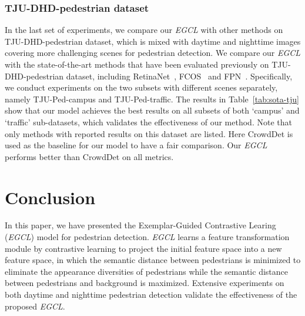 \documentclass[journal]{IEEEtran}
\newcommand{\MR}[1]{\textcolor[rgb]{0,0,0} {#1}}
\begin{document}
\subsubsection{TJU-DHD-pedestrian dataset}
In the last set of experiments, we compare our \emph{EGCL} with other methods on TJU-DHD-pedestrian dataset, which is mixed with daytime and nighttime images covering more challenging scenes for pedestrian detection. We compare our \emph{EGCL} with the state-of-the-art methods that have been evaluated previously on TJU-DHD-pedestrian dataset, including RetinaNet~\cite{lin2017focal}, FCOS~\cite{tian2019fcos} and FPN~\cite{lin2017feature}.  Specifically, we conduct experiments on the two subsets with different scenes separately, namely TJU-Ped-campus and TJU-Ped-traffic.
The results in Table~\ref{tab:sota-tju} show that our model achieves the best results on all subsets of both `campus' and `traffic' sub-datasets, which validates the effectiveness of our method. Note that only methods with reported results on this dataset are listed. Here CrowdDet is used as the baseline for our model to have a fair comparison. Our \emph{EGCL} \MR{performs better than CrowdDet on all metrics}.
\vspace{-5pt}


\section{Conclusion}
In this paper, we have presented the Exemplar-Guided Contrastive Learing (\emph{EGCL}) model for pedestrian detection. \emph{EGCL} learns a feature transformation module by contrastive learning to project the initial feature space into a new feature space, in which the semantic distance between pedestrians is minimized to eliminate the appearance diversities of pedestrians while the semantic distance between pedestrians and background is maximized. Extensive experiments on both daytime and nighttime pedestrian detection validate the effectiveness of the proposed \emph{EGCL}.
\end{document}
